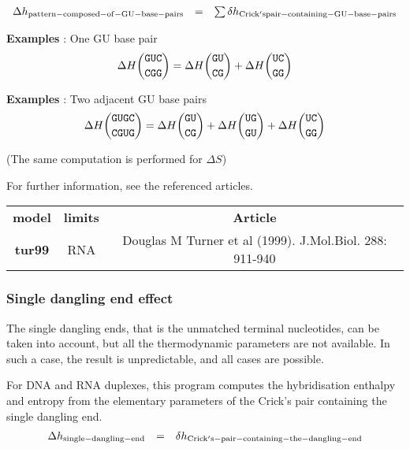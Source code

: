 \documentclass{article}
\begin{document}
\begin{displaymath}
  \begin{array}[t]{ccc}
  \Delta{}h_\mathrm{pattern-composed-of-GU-base-pairs}&=&\sum \delta{}h_\mathrm{Crick's pair-containing-GU-base-pairs}\\
  \end{array}
\end{displaymath}

\textbf{Examples} : One GU base pair
\begin{multline*}
\Delta H {\mbox{\texttt{GUC}} \choose \mbox{\texttt{CGG}}} = 
\Delta H {\mbox{\texttt{GU}} \choose \mbox{\texttt{CG}}} +
\Delta H {\mbox{\texttt{UC}} \choose \mbox{\texttt{GG}}}\\
\end{multline*}

\textbf{Examples} : Two adjacent GU base pairs
\begin{multline*}
\Delta H {\mbox{\texttt{GUGC}} \choose \mbox{\texttt{CGUG}}} = 
\Delta H {\mbox{\texttt{GU}} \choose \mbox{\texttt{CG}}} +
\Delta H {\mbox{\texttt{UG}} \choose \mbox{\texttt{GU}}} +
\Delta H {\mbox{\texttt{UC}} \choose \mbox{\texttt{GG}}}\\
\end{multline*}

       (The same computation is performed for $\Delta S$) 

       
For further information, see the referenced articles.

\begin{table}[h]
\begin{tabular}[h]{| c | c | c |}
\textbf{model} & \textbf{limits} & \textbf{Article} \\
\textbf{tur99} & RNA & Douglas M Turner et al (1999). J.Mol.Biol.  288: 911-940 \\
\end{tabular}
\end{table}

\subsubsection{Single dangling end effect}

The single dangling ends, that is the unmatched terminal nucleotides, can be taken into
account, but all the thermodynamic parameters are not available. In such a case, 
the result is unpredictable, and all cases are possible. 

For DNA and RNA duplexes, this program computes the hybridisation enthalpy and entropy from the elementary 
parameters of the Crick's pair containing the single dangling end. 
\begin{displaymath}
  \begin{array}[t]{ccc}
  \Delta{}h_\mathrm{single-dangling-end}&=&\delta{}h_\mathrm{Crick's-pair-containing-the-dangling-end}\\
  \end{array}
\end{displaymath}
\end{document}
